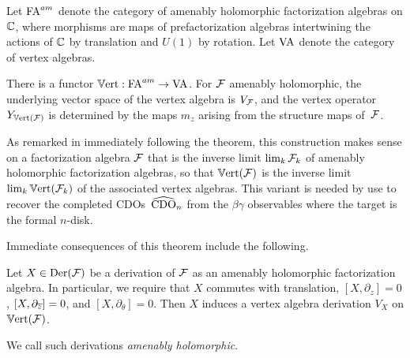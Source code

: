 Let ${\rm FA}^{am}$ denote the category of amenably holomorphic factorization algebras on $\mathbb C$,
where morphisms are maps of prefactorization algebras intertwining the actions of $\mathbb C$ by translation and $U(1)$ by rotation.
Let ${\rm VA}$ denote the category of vertex algebras.

\begin{thm} 
\label{theorem_vertex_algebra}
There is a functor $\mathbb{V}{\rm ert}:{\rm FA}^{am} \to {\rm VA}$. 
For $\mathcal F$ amenably holomorphic, the underlying vector space of the vertex algebra is $V_\mathcal F$,
and the vertex operator $Y_{\mathbb{V}{\rm ert}(\mathcal F)}$ is determined by the maps $m_z$ arising from the structure maps of~$\mathcal F$.
\end{thm}

\begin{rmk}
\label{rmk on completions}
As remarked in \cite{CG1} immediately following the theorem,  
this construction makes sense on a factorization algebra $\mathcal F$ that is the inverse limit $\lim_k \mathcal F_k$ of amenably holomorphic factorization algebras,
so that $\mathbb{V}{\rm ert}(\mathcal F)$ is the inverse limit $\lim_k \mathbb{V}{\rm ert}(\mathcal F_k)$ of the associated vertex algebras.
This variant is needed by use to recover the completed CDOs~$\widehat{\rm CDO}_n$ from the $\beta\gamma$ observables where the target is the formal $n$-disk.
\end{rmk}

Immediate consequences of this theorem include the following.

\begin{lemma}\label{factder}
Let $X \in {\rm Der}(\mathcal F)$ be a derivation of $\mathcal F$ as an amenably holomorphic factorization algebra. In particular, we require that $X$ commutes with translation, $[X, \partial_z] = 0$, $[X, \partial_{\overline{z}}] = 0$, and $[X, \partial_\theta] = 0$. Then $X$ induces a vertex algebra derivation $V_X$ on $\mathbb{V}{\rm ert}(\mathcal F)$.
\end{lemma}

We call such derivations {\em amenably holomorphic}.

